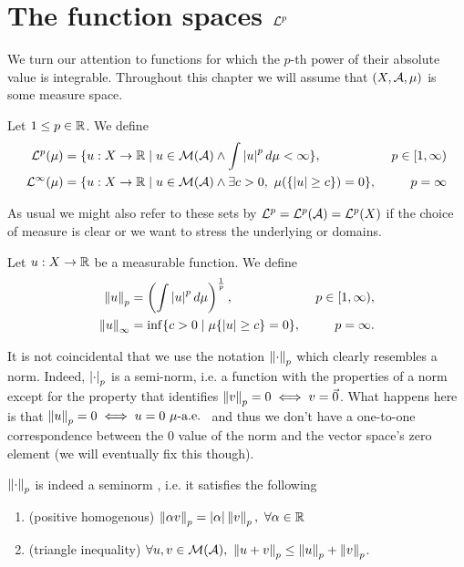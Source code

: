 
\chapter{\texorpdfstring{The function spaces $\mathcal{L}^p$}{The function spaces Lp}}

We turn our attention to functions for which the $p$-th power of their absolute value is integrable. Throughout this chapter we will assume that $(X, \mathcal{A}, \mu)$ is some measure space.

\begin{dfn}
	Let $1 \leq p \in \mathbb{R}$. We define
	\begin{align}
		\mathcal{L}^p(\mu) &= \{u : X \to \mathbb{R} \mid u \in \mathcal{M}(\mathcal{A}) \land \int \left\vert{u}\right\vert^p d\mu < \infty  \},\ &p \in [1, \infty) \\
		\mathcal{L}^\infty(\mu) &= \{u : X \to \mathbb{R} \mid u \in \mathcal{M}(\mathcal{A}) \land \exists c > 0,\ \mu(\{\left\vert{u}\right\vert \geq c\}) = 0\},\ &p = \infty
	\end{align}
\end{dfn}

As usual we might also refer to these sets by $\mathcal{L}^p = \mathcal{L}^p(\mathcal{A}) = \mathcal{L}^p(X)$ if the choice of measure is clear or we want to stress the underlying \sigas or domains.

\begin{dfn}[$p$-seminorm]
	Let $u: X \to \mathbb{R}$ be a measurable function. We define
	\begin{align}
		\left\Vert{u}\right\Vert_p &= \left(\int \left\vert{u}\right\vert^p d \mu \right)^{\frac{1}{p}},\ &p \in [1,\infty), \\
		\left\Vert{u}\right\Vert_\infty &= \inf \{ c > 0 \mid \mu\{\left\vert{u}\right\vert \geq c \} = 0\},\ &p = \infty.
	\end{align}
\end{dfn}

It is not coincidental that we use the notation $\left\Vert{\cdot}\right\Vert_p$ which clearly resembles a norm. Indeed, $\left\vert{\cdot}\right\vert_p$ is a semi-norm, i.e. a function with the properties of a norm except for the property that identifies $\left\Vert{v}\right\Vert_p = 0 \iff v = \vec{0}$. What happens here is that $\left\Vert{u}\right\Vert_p = 0 \iff u = 0 \ \mu\text{-a.e. }$ and thus we don't have a one-to-one correspondence between the 0 value of the norm and the vector space's zero element (we will eventually fix this though).

\begin{lem}
	$\left\Vert{\cdot}\right\Vert_p$ is indeed a seminorm \cite{wiki-norm}, i.e. it satisfies the following
	\begin{enumerate}
		\item (positive homogenous) $\left\Vert{\alpha v}\right\Vert_p = \left\vert{\alpha}\right\vert\left\Vert{v}\right\Vert_p,\ \forall \alpha \in \mathbb{R}$
		\item (triangle inequality) $\forall u, v \in \mathcal{M}(\mathcal{A}),\ \left\Vert{u + v}\right\Vert_p \leq \left\Vert{u}\right\Vert_p + \left\Vert{v}\right\Vert_p$.
	\end{enumerate}
\end{lem}

